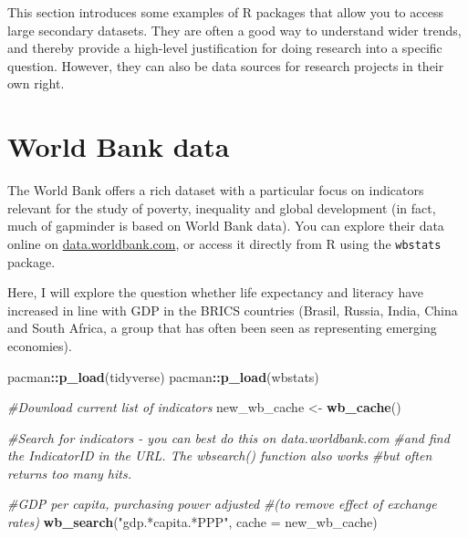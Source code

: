 \documentclass[
]{book}
\newenvironment{Shaded}{\begin{snugshade}}{\end{snugshade}}
\newcommand{\CommentTok}[1]{\textcolor[rgb]{0.56,0.35,0.01}{\textit{#1}}}
\newcommand{\DataTypeTok}[1]{\textcolor[rgb]{0.13,0.29,0.53}{#1}}
\newcommand{\KeywordTok}[1]{\textcolor[rgb]{0.13,0.29,0.53}{\textbf{#1}}}
\newcommand{\NormalTok}[1]{#1}
\newcommand{\OperatorTok}[1]{\textcolor[rgb]{0.81,0.36,0.00}{\textbf{#1}}}
\newcommand{\StringTok}[1]{\textcolor[rgb]{0.31,0.60,0.02}{#1}}
\begin{document}
This section introduces some examples of R packages that allow you to access large secondary datasets. They are often a good way to understand wider trends, and thereby provide a high-level justification for doing research into a specific question. However, they can also be data sources for research projects in their own right.

\hypertarget{world-bank-data}{%
\section{World Bank data}\label{world-bank-data}}

The World Bank offers a rich dataset with a particular focus on indicators relevant for the study of poverty, inequality and global development (in fact, much of gapminder is based on World Bank data). You can explore their data online on \href{https://data.worldbank.com}{data.worldbank.com}, or access it directly from R using the \texttt{wbstats} package.

Here, I will explore the question whether life expectancy and literacy have increased in line with GDP in the BRICS countries (Brasil, Russia, India, China and South Africa, a group that has often been seen as representing emerging economies).

\begin{Shaded}
\begin{Highlighting}[]
\NormalTok{pacman}\OperatorTok{::}\KeywordTok{p_load}\NormalTok{(tidyverse)}
\NormalTok{pacman}\OperatorTok{::}\KeywordTok{p_load}\NormalTok{(wbstats)}
\end{Highlighting}
\end{Shaded}

\begin{Shaded}
\begin{Highlighting}[]
\CommentTok{#Download current list of indicators}
\NormalTok{new_wb_cache <-}\StringTok{ }\KeywordTok{wb_cache}\NormalTok{()}

\CommentTok{#Search for indicators - you can best do this on data.worldbank.com }
\CommentTok{#and find the IndicatorID in the URL. The wbsearch() function also works}
\CommentTok{#but often returns too many hits.}

\CommentTok{#GDP per capita, purchasing power adjusted }
\CommentTok{#(to remove effect of exchange rates)}
\KeywordTok{wb_search}\NormalTok{(}\StringTok{"gdp.*capita.*PPP"}\NormalTok{, }\DataTypeTok{cache =}\NormalTok{ new_wb_cache)}
\end{Highlighting}
\end{Shaded}
\end{document}
